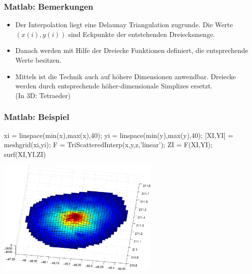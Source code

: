 \documentclass[hyperref={xetex}]{beamer}
\begin{document}
%
% 
\begin{frame}[fragile]\frametitle{Matlab: Bemerkungen}
\begin{itemize}
\item Der Interpolation liegt eine \alert{Delaunay} Triangulation zugrunde. Die Werte
  $(x(i),y(i))$ sind Eckpunkte der entstehenden Dreiecksmenge.
\item Danach werden mit Hilfe der Dreiecke Funktionen  definiert, die
  entsprechende Werte besitzen. 
\item Mittels  ist die Technik auch auf h\"ohere Dimensionen
  anwendbar. Dreiecke werden durch entsprechende höher-dimensionale
  Simplizes ersetzt. \\
(In 3D: Tetraeder)
\end{itemize}
\end{frame}
%
% 
\begin{frame}[fragile]\frametitle{Matlab: Beispiel}
\begin{matlabin}
xi = linspace(min(x),max(x),40);
yi = linspace(min(y),max(y),40);
[XI,YI] = meshgrid(xi,yi);
F = TriScatteredInterp(x,y,z,'linear');
ZI = F(XI,YI);
surf(XI,YI,ZI)
\end{matlabin}
\begin{center}
\includegraphics[width=0.6\textwidth]{figures/beispiel_scattered_data_plot}
\end{center}
\end{frame}
\end{document}
